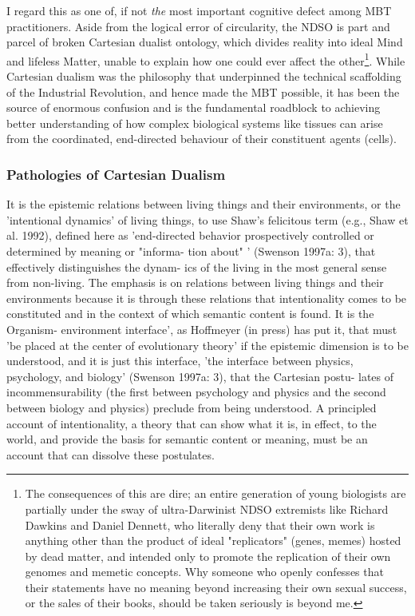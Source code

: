 I regard this as one of, if not \textit{the} most important cognitive defect among MBT practitioners. Aside from the logical error of circularity, the NDSO is part and parcel of broken Cartesian dualist ontology, which divides reality into ideal Mind and lifeless Matter, unable to explain how one could ever affect the other\footnote{The consequences of this are dire; an entire generation of young biologists are partially under the sway of ultra-Darwinist NDSO extremists like Richard Dawkins and Daniel Dennett, who literally deny that their own work is anything other than the product of ideal "replicators" (genes, memes) hosted by dead matter, and intended only to promote the replication of their own genomes and memetic concepts. Why someone who openly confesses that their statements have no meaning beyond increasing their own sexual success, or the sales of their books, should be taken seriously is beyond me.}. While Cartesian dualism was the philosophy that underpinned the technical scaffolding of the Industrial Revolution, and hence made the MBT possible, it has been the source of enormous confusion and is the fundamental roadblock to achieving better understanding of how complex biological systems like tissues can arise from the coordinated, end-directed behaviour of their constituent agents (cells).

\subsubsection{Pathologies of Cartesian Dualism}

\begin{longquote}
It is the epistemic relations between living things and their
environments, or the 'intentional dynamics' of living things, to use Shaw's
felicitous term (e.g., Shaw et al. 1992), defined here as 'end-directed
behavior prospectively controlled or determined by meaning or "informa-
tion about" ' (Swenson 1997a: 3), that effectively distinguishes the dynam-
ics of the living in the most general sense from non-living. The emphasis
is on relations between living things and their environments because it is
through these relations that intentionality comes to be constituted and
in the context of which semantic content is found. It is the Organism-
environment interface', as Hoffmeyer (in press) has put it, that must 'be
placed at the center of evolutionary theory' if the epistemic dimension is to
be understood, and it is just this interface, 'the interface between physics,
psychology, and biology' (Swenson 1997a: 3), that the Cartesian postu-
lates of incommensurability (the first between psychology and physics and
the second between biology and physics) preclude from being understood.
A principled account of intentionality, a theory that can show what it is,
in effect, to the world, and provide the basis for semantic content or
meaning, must be an account that can dissolve these postulates.
\cite{Swenson1999}
\end{longquote}


